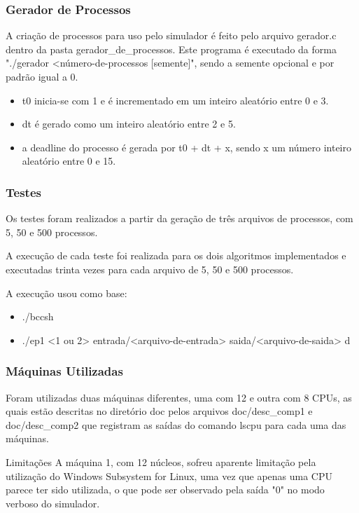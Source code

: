 \documentclass{beamer}
\begin{document}
\begin{frame}
\frametitle{Gerador de Processos}
A criação de processos para uso pelo simulador é feito pelo arquivo gerador.c dentro da pasta gerador\_de\_processos.
    Este programa é executado da forma "./gerador <número-de-processos [semente]", sendo a semente opcional e por
    padrão igual a 0.
\begin{itemize}
    \item t0 inicia-se com 1 e é incrementado em um inteiro aleatório entre 0 e 3.
    \item dt é gerado como um inteiro aleatório entre 2 e 5.
    \item a deadline do processo é gerada por t0 + dt + x, sendo x um número inteiro aleatório entre 0 e 15.
\end{itemize}
\end{frame}

\begin{frame}
\frametitle{Testes}
Os testes foram realizados a partir da geração de três arquivos de processos, com 5, 50 e 500 processos.

A execução de cada teste foi realizada para os dois algoritmos implementados e executadas trinta vezes para cada arquivo
de 5, 50 e 500 processos.

A execução usou como base:
\begin{itemize}
    \item ./bccsh
    \item ./ep1 <1 ou 2> entrada/<arquivo-de-entrada> saida/<arquivo-de-saida> d
\end{itemize}

\end{frame}

\begin{frame}
\frametitle{Máquinas Utilizadas}

Foram utilizadas duas máquinas diferentes, uma com 12 e outra com 8 CPUs, as quais estão descritas no diretório doc
    pelos arquivos doc/desc\_comp1 e doc/desc\_comp2 que registram as saídas do comando lscpu para cada uma das máquinas.


\begin{block}{Limitações}
A máquina 1, com 12 núcleos, sofreu aparente limitação pela utilização do Windows Subsystem for Linux, uma vez que
    apenas uma CPU parece ter sido utilizada, o que pode ser observado pela saída "0" no modo verboso do simulador.
\end{block}
\end{frame}
\end{document}
